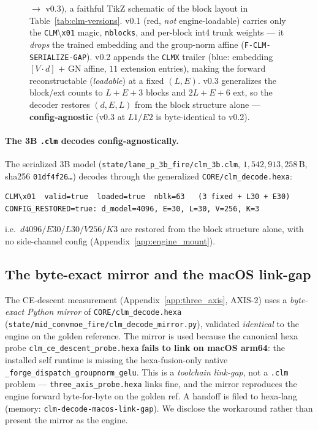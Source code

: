 \begin{figure}[h]
{$\rightarrow$ v0.3), a faithful TikZ schematic of the block layout in
Table~\ref{tab:clm-versions}. v0.1 (\textcolor{red!70!black}{red}, \emph{not}
engine-loadable) carries only the \texttt{CLM}\textbackslash\texttt{x01} magic,
\texttt{nblocks}, and per-block int4 trunk weights --- it \emph{drops} the trained
embedding and the group-norm affine (\texttt{F-CLM-SERIALIZE-GAP}). v0.2 appends
the \texttt{CLMX} trailer (\textcolor{blue!50!black}{blue}: embedding $[V{\cdot}d]$
$+$ GN affine, $11$ extension entries), making the forward reconstructable
(\emph{loadable}) at a fixed $(L,E)$. v0.3 generalizes the block/ext counts to
$L{+}E{+}3$ blocks and $2L{+}E{+}6$ ext, so the decoder restores $(d,E,L)$ from
the block structure alone --- \textbf{config-agnostic} (v0.3 at $L1/E2$ is
byte-identical to v0.2).}
\label{fig:clm-grammar}
\end{figure}

\paragraph{The 3B \texttt{.clm} decodes config-agnostically.} The serialized 3B
model (\texttt{state/lane\_p\_3b\_fire/clm\_3b.clm}, $1{,}542{,}913{,}258$\,B,
sha256 \texttt{01df4f26\dots}) decodes through the generalized
\texttt{CORE/clm\_decode.hexa}:
\begin{verbatim}
CLM\x01  valid=true  loaded=true  nblk=63   (3 fixed + L30 + E30)
CONFIG_RESTORED=true: d_model=4096, E=30, L=30, V=256, K=3
\end{verbatim}
i.e.\ $d4096/E30/L30/V256/K3$ are restored from the block structure alone, with
no side-channel config (Appendix~\ref{app:engine_mount}).

\subsection{The byte-exact mirror and the macOS link-gap}
\label{app:clm-mirror}

The CE-descent measurement (Appendix~\ref{app:three_axis}, AXIS-2) uses a
\emph{byte-exact Python mirror} of \texttt{CORE/clm\_decode.hexa}
(\texttt{state/mid\_convmoe\_fire/clm\_decode\_mirror.py}), validated
\emph{identical} to the engine on the golden reference. The mirror is used because
the canonical hexa probe \texttt{clm\_ce\_descent\_probe.hexa}
\textbf{fails to link on macOS arm64}: the installed self runtime is missing the
hexa-fusion-only native \texttt{\_forge\_dispatch\_groupnorm\_gelu}. This is a
\emph{toolchain link-gap}, not a \texttt{.clm} problem --- \texttt{three\_axis\_probe.hexa}
links fine, and the mirror reproduces the engine forward byte-for-byte on the
golden ref. A handoff is filed to hexa-lang (memory: \texttt{clm-decode-macos-link-gap}).
We disclose the workaround rather than present the mirror as the engine.


